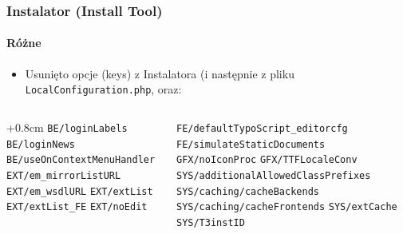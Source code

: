 
\begin{frame}[fragile]
	\frametitle{Instalator (Install Tool)}
	\framesubtitle{Różne}

	\begin{itemize}
		\item Usunięto opcje (keys) z Instalatora\newline
			\small(i następnie z pliku \texttt{LocalConfiguration.php}, oraz:\normalsize
	\end{itemize}

	\begin{columns}[T]
		\begin{column}{.5\textwidth}
			\advance\leftskip+0.8cm
			\smaller
				\texttt{BE/loginLabels}\newline
				\texttt{BE/loginNews}\newline
				\texttt{BE/useOnContextMenuHandler}\newline
				\texttt{EXT/em\_mirrorListURL}\newline
				\texttt{EXT/em\_wsdlURL}\newline
				\texttt{EXT/extList}\newline
				\texttt{EXT/extList\_FE}\newline
				\texttt{EXT/noEdit}\newline
			\normalsize
		\end{column}
		\begin{column}{.5\textwidth}
			\smaller
				\texttt{FE/defaultTypoScript\_editorcfg}\newline
				\texttt{FE/simulateStaticDocuments}\newline
				\texttt{GFX/noIconProc}\newline
				\texttt{GFX/TTFLocaleConv}\newline
				\texttt{SYS/additionalAllowedClassPrefixes}\newline
				\texttt{SYS/caching/cacheBackends}\newline
				\texttt{SYS/caching/cacheFrontends}\newline
				\texttt{SYS/extCache}\newline
				\texttt{SYS/T3instID}\newline
			\normalsize
		\end{column}

	\end{columns}

\end{frame}


